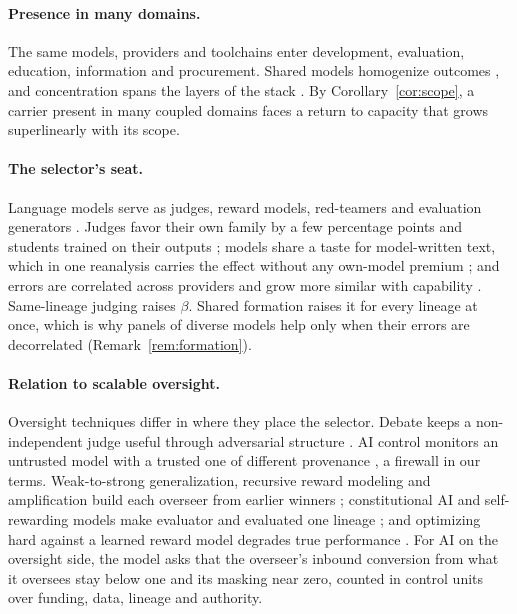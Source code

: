 \documentclass[letterpaper]{article} %
\theoremstyle{definition}
\begin{document}
\paragraph{Presence in many domains.} The same models, providers and toolchains enter development, evaluation, education, information and procurement. Shared models homogenize outcomes \citep{bommasani2021,bommasani2022}, and concentration spans the layers of the stack \citep{narechania2024}. By Corollary~\ref{cor:scope}, a carrier present in many coupled domains faces a return to capacity that grows superlinearly with its scope.

\paragraph{The selector's seat.} Language models serve as judges, reward models, red-teamers and evaluation generators \citep{zheng2023,perez2022,bai2022}. Judges favor their own family by a few percentage points \citep{awuni2026} and students trained on their outputs \citep{li2026preference}; models share a taste for model-written text, which in one reanalysis carries the effect without any own-model premium \citep{laurito2025,zatuchin2026}; and errors are correlated across providers and grow more similar with capability \citep{kim2025,goel2025}. Same-lineage judging raises $\beta$. Shared formation raises it for every lineage at once, which is why panels of diverse models \citep{verga2024} help only when their errors are decorrelated (Remark~\ref{rem:formation}).

\paragraph{Relation to scalable oversight.} Oversight techniques differ in where they place the selector. Debate keeps a non-independent judge useful through adversarial structure \citep{irving2018}. AI control monitors an untrusted model with a trusted one of different provenance \citep{greenblatt2024}, a firewall in our terms. Weak-to-strong generalization, recursive reward modeling and amplification build each overseer from earlier winners \citep{burns2024,leike2018,christiano2018}; constitutional AI and self-rewarding models make evaluator and evaluated one lineage \citep{bai2022,yuan2024}; and optimizing hard against a learned reward model degrades true performance \citep{gao2023}. For AI on the oversight side, the model asks that the overseer's inbound conversion from what it oversees stay below one and its masking near zero, counted in control units over funding, data, lineage and authority.
\end{document}
